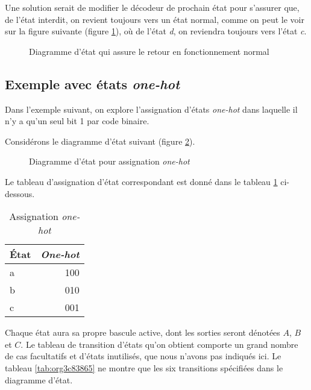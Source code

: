 \documentclass[11pt]{article}
\begin{document}
Une solution serait de modifier le décodeur de prochain état pour
s'assurer que, de l'état interdit, on revient toujours vers un état
normal, comme on peut le voir sur la figure suivante (figure
\ref{fig:org0a612c9}), où de l'état \emph{d}, on reviendra toujours
vers l'état \emph{c}. 

\begin{figure}[htbp]
\centering

\caption{\label{fig:org0a612c9}Diagramme d'état qui assure le retour en fonctionnement normal}
\end{figure}

\subsection{Exemple avec états \emph{one-hot}}
\label{sec:orgbc0e279}

Dans l'exemple suivant, on explore l'assignation d'états \emph{one-hot}
dans laquelle il n'y a qu'un seul bit 1 par code binaire.

Considérons le diagramme d'état suivant (figure \ref{fig:org8494595}).

\begin{figure}[htbp]
\centering

\caption{\label{fig:org8494595}Diagramme d'état pour assignation \emph{one-hot}}
\end{figure}

Le tableau d'assignation d'état correspondant est donné dans le
tableau \ref{tab:org24fc617} ci-dessous.

\begin{table}[htbp]
\caption{\label{tab:org24fc617}Assignation \emph{one-hot}}
\centering
\begin{tabular}{lr}
État & \emph{One-hot}\\
\hline
a & 100\\
b & 010\\
c & 001\\
\end{tabular}
\end{table}

Chaque état aura sa propre bascule active, dont les sorties seront
dénotées \(A\), \(B\) et \(C\). Le tableau de transition d'états qu'on
obtient comporte un grand nombre de cas facultatifs et d'états
inutilisés, que nous n'avons pas indiqués ici. Le tableau
\ref{tab:org3c83865} ne montre que les six transitions spécifiées
dans le diagramme d'état.
\end{document}
